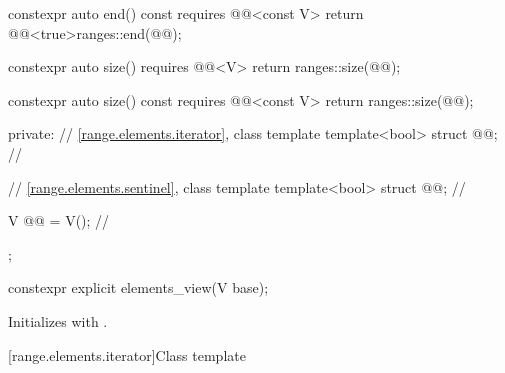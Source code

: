 \begin{codeblock}
{{    constexpr auto end() const requires @@<const V>
    { return @@<true>{ranges::end(@@)}; }

    constexpr auto size() requires @@<V>
    { return ranges::size(@@); }

    constexpr auto size() const requires @@<const V>
    { return ranges::size(@@); }

  private:
    // \ref{range.elements.iterator}, class template 
    template<bool> struct @@;                     // \expos

    // \ref{range.elements.sentinel}, class template 
    template<bool> struct @@;                     // \expos

    V @@ = V();                                      // \expos
  };
}
\end{codeblock}

%
\begin{itemdecl}
constexpr explicit elements_view(V base);
\end{itemdecl}

\begin{itemdescr}
\pnum
\effects
Initializes  with .
\end{itemdescr}

[range.elements.iterator]{Class template }

